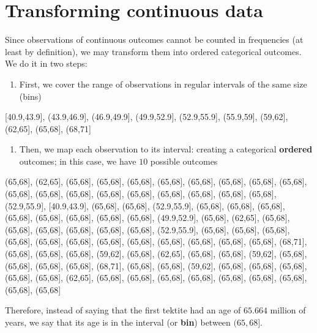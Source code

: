 \documentclass[
]{book}
\providecommand{\tightlist}{%
  \setlength{\itemsep}{0pt}\setlength{\parskip}{0pt}}
\begin{document}
\hypertarget{transforming-continuous-data}{%
\section{Transforming continuous data}\label{transforming-continuous-data}}

Since observations of continuous outcomes cannot be counted in frequencies (at least by definition), we may transform them into ordered categorical outcomes. We do it in two steps:

\begin{enumerate}
\def\labelenumi{\arabic{enumi})}
\tightlist
\item
  First, we cover the range of observations in regular intervals of the same size (bins)
\end{enumerate}

{[}40.9,43.9{]}, (43.9,46.9{]}, (46.9,49.9{]}, (49.9,52.9{]}, (52.9,55.9{]}, (55.9,59{]}, (59,62{]}, (62,65{]}, (65,68{]}, (68,71{]}

\begin{enumerate}
\def\labelenumi{\arabic{enumi})}
\setcounter{enumi}{1}
\tightlist
\item
  Then, we map each observation to its interval: creating a categorical \textbf{ordered} outcomes; in this case, we have \(10\) possible outcomes
\end{enumerate}

(65,68{]}, (62,65{]}, (65,68{]}, (65,68{]}, (65,68{]}, (65,68{]}, (65,68{]}, (65,68{]}, (65,68{]}, (65,68{]}, (65,68{]}, (65,68{]}, (65,68{]}, (65,68{]}, (65,68{]}, (65,68{]}, (65,68{]}, (65,68{]}, (65,68{]}, (52.9,55.9{]}, {[}40.9,43.9{]}, (65,68{]}, (65,68{]}, (52.9,55.9{]}, (65,68{]}, (65,68{]}, (65,68{]}, (65,68{]}, (65,68{]}, (65,68{]}, (65,68{]}, (65,68{]}, (49.9,52.9{]}, (65,68{]}, (62,65{]}, (65,68{]}, (65,68{]}, (65,68{]}, (65,68{]}, (65,68{]}, (65,68{]}, (52.9,55.9{]}, (65,68{]}, (65,68{]}, (65,68{]}, (65,68{]}, (65,68{]}, (65,68{]}, (65,68{]}, (65,68{]}, (65,68{]}, (65,68{]}, (65,68{]}, (65,68{]}, (68,71{]}, (65,68{]}, (65,68{]}, (65,68{]}, (59,62{]}, (65,68{]}, (62,65{]}, (65,68{]}, (65,68{]}, (59,62{]}, (65,68{]}, (65,68{]}, (65,68{]}, (65,68{]}, (68,71{]}, (65,68{]}, (65,68{]}, (59,62{]}, (65,68{]}, (65,68{]}, (65,68{]}, (65,68{]}, (65,68{]}, (62,65{]}, (65,68{]}, (65,68{]}, (65,68{]}, (65,68{]}, (65,68{]}, (65,68{]}, (65,68{]}, (65,68{]}, (65,68{]}

Therefore, instead of saying that the first tektite had an age of \(65.664\) million of years, we say that its age is in the interval (or \textbf{bin}) between \((65,68]\).
\end{document}
